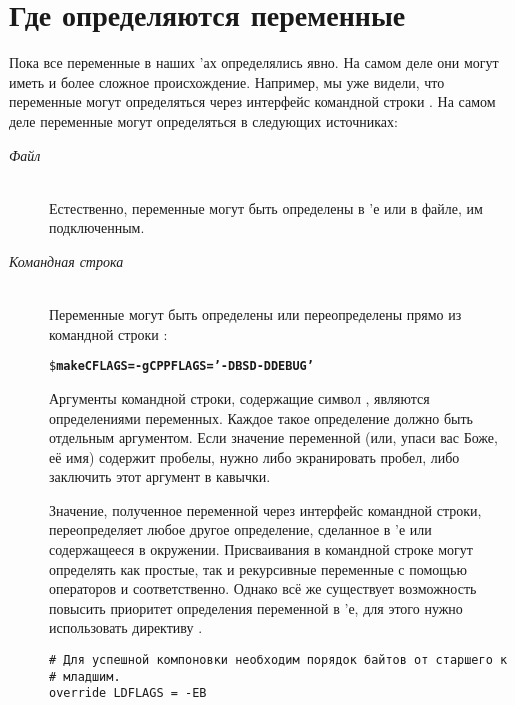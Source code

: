 \section{Где определяются переменные}
\label{sec:where_vars_come_from}

Пока все переменные в наших \Makefile{}'ах определялись явно. На самом
деле они могут иметь и более сложное происхождение. Например, мы уже
видели, что переменные могут определяться через интерфейс командной
строки \GNUmake{}. На самом деле переменные могут определяться в
следующих источниках:

\begin{description}
\item[\emph{Файл}] \hfill \\
Естественно, переменные могут быть определены в \Makefile{}'е или в
файле, им подключенным.
\item[\emph{Командная строка}] \hfill \\
Переменные могут быть определены или переопределены прямо из командной
строки \GNUmake{}:

{\footnotesize
\begin{alltt}
\$ \textbf{make CFLAGS=-g CPPFLAGS='-DBSD -DDEBUG'}
\end{alltt}
}

Аргументы командной строки, содержащие символ \command{=}, являются
определениями переменных. Каждое такое определение должно быть
отдельным аргументом. Если значение переменной (или, упаси вас Боже,
её имя) содержит пробелы, нужно либо экранировать пробел, либо
заключить этот аргумент в кавычки.

Значение, полученное переменной через интерфейс командной строки,
переопределяет любое другое определение, сделанное в \Makefile{}'е или
содержащееся в окружении. Присваивания в командной строке могут
определять как простые, так и рекурсивные переменные с помощью
операторов \command{:=} и \command{=} соответственно. Однако всё же
существует возможность повысить приоритет определения переменной в
\Makefile{}'е, для этого нужно использовать директиву
.

{\footnotesize
\begin{verbatim}
# Для успешной компоновки необходим порядок байтов от старшего к
# младшим.
override LDFLAGS = -EB
\end{verbatim}
}


\end{description}
